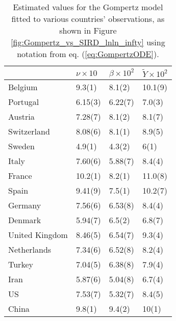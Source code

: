 
\begin{table}[H]
\label{tab:gomp}
\centering
\caption{Estimated values for the Gompertz model fitted to various countries' observations, as shown in Figure \ref{fig:Gompertz_vs_SIRD_lnln_infty} using notation from eq. (\ref{eq:GompertzODE}).}
\begin{tabular}{llll}
\toprule
{} &             $\nu\times 10$ &           $\beta\times 10^{2}$ &        $\tilde{Y}\times 10^{2}$ \\
\midrule
Belgium        &   9.3(1) &   8.1(2) &  10.1(9) \\
Portugal       &  6.15(3) &  6.22(7) &   7.0(3) \\
Austria        &  7.28(7) &   8.1(2) &   8.1(7) \\
Switzerland    &  8.08(6) &   8.1(1) &   8.9(5) \\
Sweden         &   4.9(1) &   4.3(2) &     6(1) \\
Italy          &  7.60(6) &  5.88(7) &   8.4(4) \\
France         &  10.2(1) &   8.2(1) &  11.0(8) \\
Spain          &  9.41(9) &   7.5(1) &  10.2(7) \\
Germany        &  7.56(6) &  6.53(8) &   8.4(4) \\
Denmark        &  5.94(7) &   6.5(2) &   6.8(7) \\
United Kingdom &  8.46(5) &  6.54(7) &   9.3(4) \\
Netherlands    &  7.34(6) &  6.52(8) &   8.2(4) \\
Turkey         &  7.04(5) &  6.38(8) &   7.9(4) \\
Iran           &  5.87(6) &  5.04(8) &   6.7(4) \\
US             &  7.53(7) &  5.32(7) &   8.4(5) \\
China          &   9.8(1) &   9.4(2) &    10(1) \\
\bottomrule
\end{tabular}
\end{table}

